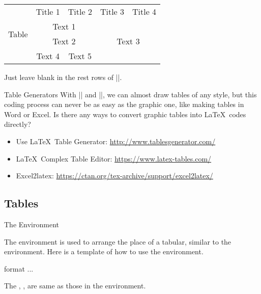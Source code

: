 \begin{frame}[fragile]

\begin{latexexample}
\centering
\begin{tabular}{|c|c|c|c|c|}
  \hline
  \multirow{4}{*}{Table} & Title 1 & Title 2 & Title 3 & Title 4 \\
  \cline{2-5}
  & \multicolumn{2}{c|}{Text 1} & 
  \multicolumn{2}{c|}{\multirow{3}{*}{Text 3}} \\
  \cline{2-3}
  & \multicolumn{2}{c|}{Text 2} & \multicolumn{2}{c|}{} \\
  \cline{2-3}
  & Text 4 & Text 5 & \multicolumn{2}{c|}{} \\
  \hline
\end{tabular}
\end{latexexample}

Just leave blank in the rest rows of \LC|\multirow|.

\end{frame}

\begin{frame}[fragile]{Table Generators}
	With \LC|\multirow| and \LC|\multicolumn|, we can almost draw tables of any style, but this coding process can never be as easy as the graphic one, like making tables in Word or Excel. Is there any ways to convert graphic tables into \LaTeX\ codes directly?\\
	\begin{itemize}
		\item Use \LaTeX\ Table Generator: \url{http://www.tablesgenerator.com/}
		\item \LaTeX\ Complex Table Editor: \url{https://www.latex-tables.com/}
		\item Excel2latex: \url{https://ctan.org/tex-archive/support/excel2latex/}
	\end{itemize}
\end{frame}

\subsection{Tables}

\begin{frame}[fragile]{The  Environment}

The  environment is used to arrange the place of a tabular, similar to the  environment. Here is a template of how to use the environment.

\begin{command}
\begin{LCL}
\begin{table}[position]
  \centering
  \begin{tabular}{format}
    ...
  \end{tabular}
  \caption{caption}
  \label{table:label}
\end{table}
\end{LCL}
\end{command}

The , ,  are same as those in the  environment. 
\end{frame}

